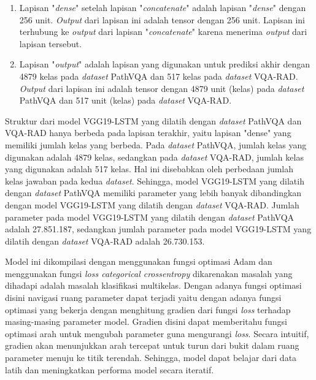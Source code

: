 \begin{enumerate}
  \item Lapisan "\textit{dense}" setelah lapisan "\textit{concatenate}" adalah lapisan "\textit{dense}" dengan 256 unit. \textit{Output} dari lapisan ini adalah tensor dengan 256 unit. Lapisan ini terhubung ke \textit{output} dari lapisan "\textit{concatenate}" karena menerima \textit{output} dari lapisan tersebut.

  \item Lapisan "\textit{output}" adalah lapisan yang digunakan untuk prediksi akhir dengan 4879 kelas pada \textit{dataset} PathVQA dan 517 kelas pada \textit{dataset} VQA-RAD. \textit{Output} dari lapisan ini adalah tensor dengan 4879 unit (kelas) pada \textit{dataset} PathVQA dan 517 unit (kelas) pada \textit{dataset} VQA-RAD.

\end{enumerate}


\par Struktur dari model VGG19-LSTM yang dilatih dengan \textit{dataset} PathVQA dan VQA-RAD hanya berbeda pada lapisan terakhir, yaitu lapisan "dense" yang memiliki jumlah kelas yang berbeda. Pada \textit{dataset} PathVQA, jumlah kelas yang digunakan adalah 4879 kelas, sedangkan pada \textit{dataset} VQA-RAD, jumlah kelas yang digunakan adalah 517 kelas. Hal ini disebabkan oleh perbedaan jumlah kelas jawaban pada kedua \textit{dataset}. Sehingga, model VGG19-LSTM yang dilatih dengan \textit{dataset} PathVQA memiliki parameter yang lebih banyak dibandingkan dengan model VGG19-LSTM yang dilatih dengan \textit{dataset} VQA-RAD. Jumlah parameter pada model VGG19-LSTM yang dilatih dengan \textit{dataset} PathVQA adalah 27.851.187, sedangkan jumlah parameter pada model VGG19-LSTM yang dilatih dengan \textit{dataset} VQA-RAD adalah 26.730.153.

\par Model ini dikompilasi dengan menggunakan fungsi optimasi Adam dan menggunakan fungsi \textit{loss categorical crossentropy} dikarenakan masalah yang dihadapi adalah masalah klasifikasi multikelas. Dengan adanya fungsi optimasi disini navigasi ruang parameter dapat terjadi yaitu dengan adanya fungsi optimasi yang bekerja dengan menghitung gradien dari fungsi \textit{loss} terhadap masing-masing parameter model. Gradien disini dapat memberitahu fungsi optimasi arah untuk mengubah parameter guna mengurangi \textit{loss}. Secara intuitif, gradien akan menunjukkan arah tercepat untuk turun dari bukit dalam ruang parameter menuju ke titik terendah. Sehingga, model dapat belajar dari data latih dan meningkatkan performa model secara iteratif.

